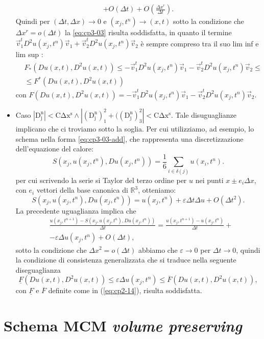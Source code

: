 \begin{itemize}
\[\begin{split}
   + O(\Delta t) + O(\frac{\Delta x^r}{\Delta t}).
\end{split}
\]
Quindi per  $(\Delta t,\Delta x)\to 0$ e $(x_j,t^n)\to(x,t)$ sotto la condizione che $\Delta x^r = o(\Delta t)$ la \eqref{eq:cp3-03} risulta soddisfatta, in quanto il termine $\vec{v}_1^tD^2u(x_j,t^n)\vec{v}_1 +\vec{v}_2^tD^2u(x_j,t^n)\vec{v}_2 $ è sempre compreso tra il suo lim inf e lim sup :
\[
\begin{split}
  &F_*(Du(x,t),D^2u(x,t))\le-\vec{v}_1^tD^2u(x_j,t^n)\vec{v}_1
  -\vec{v}_2^tD^2u(x_j,t^n)\vec{v}_2\le \\
  &\le F^*(Du(x,t),D^2u(x,t))
\end{split}
\]
con $F(Du(x,t),D^2u(x,t))=-\vec{v}_1^tD^2u(x_j,t^n)\vec{v}_1 -\vec{v}_2^tD^2u(x_j,t^n)\vec{v}_2$.
  \item \textsf{Caso} $\mathrm{|D_j^n|< C\Delta x^s\land |(D_j^n)_1^2+((D_j^n)_3^2|< C\Delta x^s}$. Tale disuguaglianze implicano che ci troviamo sotto la soglia. Per cui utilizziamo, ad esempio, lo schema nella forma \eqref{eq:cp3-03-add}, che rappresenta una discretizzazione dell'equazione del calore:
\[
S(x_j,u(x_j,t^n),Du(x_j,t^n))=\frac{1}{6}\sum_{i\in\delta(j)}u(x_i,t^n).
\]
per cui scrivendo la serie si Taylor del terzo ordine per $u$ nei punti $x\pm e_i\Delta x$, con $e_i$ vettori della base canonica di $\mathbb{R}^3$, otteniamo:
\[
S(x_j,u(x_j,t^n),Du(x_j,t^n))=u(x_j,t^n) + \varepsilon\Delta t\Delta u + O(\Delta t^2).
\]
La precedente uguaglianza implica che
\[
\begin{split}
  &\frac{u(x_j,t^{n+1})-S(x_j,u(x_j,t^n),Du(x_j,t^n))}{\Delta t}= \frac{u(x_j,t^{n+1})-u(x_j,t^n)}{\Delta t} + \\
  &  -\varepsilon\Delta u(x_j,t^n) + O(\Delta t),
\end{split}
\]
sotto la condizione che $\Delta x^2=o(\Delta t)$ abbiamo che $\varepsilon\to 0$ per $\Delta t\to 0$, quindi la condizione di consistenza generalizzata che si traduce nella seguente diseguaglianza
\[
\underline{F}(Du(x,t),D^2u(x,t))\le\varepsilon\Delta u(x_j,t^n)\le \overline{F}(Du(x,t),D^2u(x,t)),
\]
con $\underline{F}$ e $\overline{F}$ definite come in (\hyperref[eq:cp2-14]{\ref{eq:cp2-14}}), risulta soddisfatta.  
\end{itemize}
%
\section{Schema MCM \emph{volume preserving}}
\label{sec:cp3-sc3-3}

